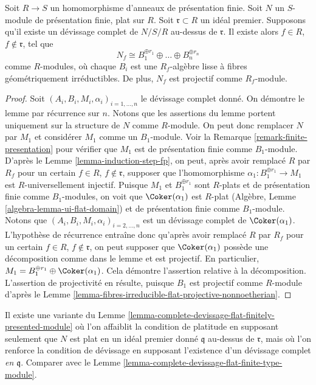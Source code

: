 \begin{lemma}
\label{lemma-complete-devissage-flat-finitely-presented-module}
Soit $R \to S$ un homomorphisme d'anneaux de présentation finie.
Soit $N$ un $S$-module de présentation finie, plat sur $R$.
Soit $\mathfrak r \subset R$ un idéal premier.
Supposons qu'il existe un d\'evissage complet de $N/S/R$ au-dessus de $\mathfrak r$.
Il existe alors $f \in R$, $f \not \in \mathfrak r$,
tel que
$$
N_f \cong B_1^{\oplus r_1} \oplus \ldots \oplus B_n^{\oplus r_n}
$$
comme $R$-modules, où chaque $B_i$ est une $R_f$-algèbre lisse à fibres géométriquement
irréductibles. De plus, $N_f$ est projectif comme $R_f$-module.
\end{lemma}

\begin{proof}
Soit $(A_i, B_i, M_i, \alpha_i)_{i = 1, \ldots, n}$ le
d\'evissage complet donné. On démontre le lemme par récurrence sur $n$.
Notons que les assertions du lemme portent uniquement sur la structure
de $N$ comme $R$-module. On peut donc remplacer $N$ par $M_1$ et
considérer $M_1$ comme un $B_1$-module. Voir
la Remarque \ref{remark-finite-presentation}
pour vérifier que $M_1$ est de présentation finie comme $B_1$-module. D'après le
Lemme \ref{lemma-induction-step-fp},
on peut, après avoir remplacé $R$ par $R_f$ pour un certain
$f \in R$, $f \not \in \mathfrak r$, supposer que
l'homomorphisme $\alpha_1 : B_1^{\oplus r_1} \to M_1$ est $R$-universellement injectif.
Puisque $M_1$ et $B_1^{\oplus r_1}$ sont $R$-plats et de présentation finie comme
$B_1$-modules, on voit que $\Coker(\alpha_1)$ est $R$-plat
(Algèbre, Lemme \ref{algebra-lemma-ui-flat-domain})
et de présentation finie comme $B_1$-module. Notons que
$(A_i, B_i, M_i, \alpha_i)_{i = 2, \ldots, n}$ est un
d\'evissage complet de $\Coker(\alpha_1)$. L'hypothèse de récurrence
entraîne donc qu'après avoir remplacé
$R$ par $R_f$ pour un certain $f \in R$, $f \not \in \mathfrak r$,
on peut supposer que $\Coker(\alpha_1)$ possède une décomposition
comme dans le lemme et est projectif. En particulier,
$M_1 = B_1^{\oplus r_1} \oplus \Coker(\alpha_1)$.
Cela démontre l'assertion relative à la décomposition.
L'assertion de projectivité en résulte, puisque $B_1$ est projectif comme
$R$-module d'après le
Lemme \ref{lemma-fibres-irreducible-flat-projective-nonnoetherian}.
\end{proof}

\begin{remark}
\label{remark-complete-devissage-flat-finitely-presented-module}
Il existe une variante du
Lemme \ref{lemma-complete-devissage-flat-finitely-presented-module}
où l'on affaiblit la condition de platitude en supposant seulement que $N$
est plat en un idéal premier donné $\mathfrak q$ au-dessus de $\mathfrak r$,
mais où l'on renforce la condition de d\'evissage en supposant
l'existence d'un d\'evissage complet {\it en $\mathfrak q$}. Comparer avec le
Lemme \ref{lemma-complete-devissage-flat-finite-type-module}.
\end{remark}

